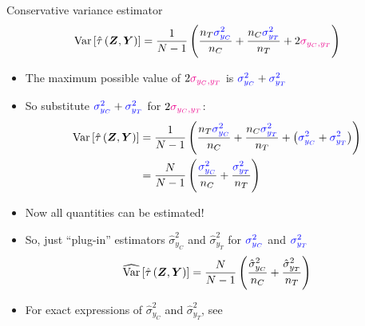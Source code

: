 \documentclass[table, xcolor = {dvipsnames}, 9pt]{beamer}
\theoremstyle{plain}
\newcommand{\bh}[1]{{\color{blue}{#1}}}
\newcommand{\mh}[1]{{\color{magenta}{#1}}}
\DeclareMathOperator{\Var}{\rm{Var}}
\begin{document}
\begin{frame}{Conservative variance estimator} 
\begin{equation*}
\Var\left[\hat{\tau}\left(\bm{Z}, \bm{Y}\right)\right] = \frac{1}{N - 1}\left(\frac{n_T \bh{\sigma^2_{y_C}}}{n_C} + \frac{n_C \bh{\sigma^2_{y_T}}}{n_T} + 2\mh{\sigma_{y_C, y_T}}\right)
\end{equation*} \pause
\begin{itemize}
\item The maximum possible value of $2\mh{\sigma_{y_C, y_T}}$ is $\bh{\sigma^2_{y_C}} + \bh{\sigma^2_{y_T}}$ 
\item So substitute $\bh{\sigma^2_{y_C}} + \bh{\sigma^2_{y_T}}$ for $2\mh{\sigma_{y_C, y_T}}$: \pause
\begin{align*}
\Var\left[\hat{\tau}\left(\bm{Z}, \bm{Y}\right)\right] & = \frac{1}{N - 1}\left(\frac{n_T \bh{\sigma^2_{y_C}}}{n_C} + \frac{n_C \bh{\sigma^2_{y_T}}}{n_T} + \left(\bh{\sigma^2_{y_C}} + \bh{\sigma^2_{y_T}}\right)\right) \\
& = \frac{N}{N - 1}\left(\frac{\bh{\sigma^2_{y_C}}}{n_C} + \frac{\bh{\sigma^2_{y_T}}}{n_T}\right)
\end{align*} \pause
\item Now all quantities can be estimated! \pause
\item So, just ``plug-in'' estimators $\hat{\sigma}^2_{y_C}$ and $\hat{\sigma}^2_{y_T}$ for $\bh{\sigma^2_{y_C}}$ and $\bh{\sigma^2_{y_T}}$
\begin{equation}
\widehat{\Var}\left[\hat{\tau}\left(\bm{Z}, \bm{Y}\right)\right] = \frac{N}{N - 1}\left(\frac{\hat{\sigma}^2_{y_C}}{n_C} + \frac{\hat{\sigma}^2_{y_T}}{n_T} \right)
\end{equation}
\item For exact expressions of $\hat{\sigma}^2_{y_C}$ and $\hat{\sigma}^2_{y_T}$, see \hyperlink{Variance estimators}{}
\end{itemize}
\end{frame}
\end{document}
